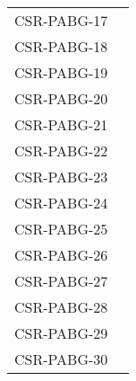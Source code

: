 \begin{longtable}{|p{1.5cm}|p{12cm}|@{}}
\begin{minipage}{12cm}
\end{minipage}\\
\hline
CSR-PABG-17&
\begin{minipage}{12cm}
\end{minipage}\\
\hline
CSR-PABG-18&
\begin{minipage}{12cm}
\end{minipage}\\
\hline
CSR-PABG-19&
\begin{minipage}{12cm}
\end{minipage}\\
\hline
CSR-PABG-20&
\begin{minipage}{12cm}
\end{minipage}\\
\hline
CSR-PABG-21&
\begin{minipage}{12cm}
\end{minipage}\\
\hline
CSR-PABG-22&
\begin{minipage}{12cm}
\end{minipage}\\
\hline
CSR-PABG-23&
\begin{minipage}{12cm}
\end{minipage}\\
\hline
CSR-PABG-24&
\begin{minipage}{12cm}
\end{minipage}\\
\hline
CSR-PABG-25&
\begin{minipage}{12cm}
\end{minipage}\\
\hline
CSR-PABG-26&
\begin{minipage}{12cm}
\end{minipage}\\
\hline
CSR-PABG-27&
\begin{minipage}{12cm}
\end{minipage}\\
\hline
CSR-PABG-28&
\begin{minipage}{12cm}
\end{minipage}\\
\hline
CSR-PABG-29&
\begin{minipage}{12cm}
\end{minipage}\\
\hline
CSR-PABG-30&
\begin{minipage}{12cm}
\end{minipage}\\

\end{longtable}
